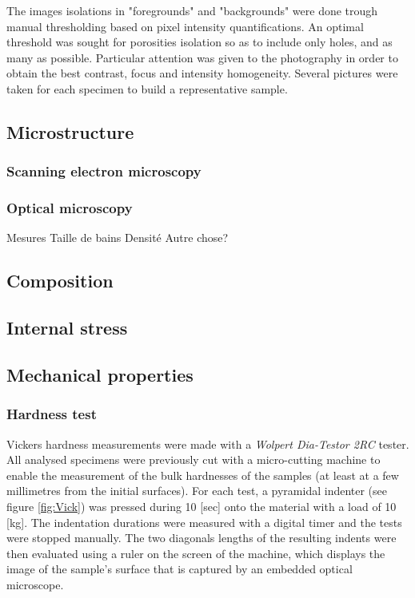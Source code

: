 The images isolations in "foregrounds" and "backgrounds" were done trough manual thresholding based on pixel intensity quantifications.  %
An optimal threshold was sought for porosities isolation so as to include only holes, and as many as possible. Particular attention was given to the photography in order to obtain the best contrast, focus and intensity homogeneity. Several pictures were taken for each specimen to build a representative sample.

\subsection{Microstructure}

\subsubsection{Scanning electron microscopy}

\subsubsection{Optical microscopy}
Mesures Taille de bains
Densité
Autre chose?
\subsection{Composition}

\subsection{Internal stress}

\subsection{Mechanical properties}

\subsubsection{Hardness test}

Vickers hardness measurements were made with a \textit{Wolpert Dia-Testor 2RC} tester. All analysed specimens were previously cut with a micro-cutting machine to enable the measurement of the bulk hardnesses of the samples (at least at a few millimetres from the initial surfaces). For each test, a pyramidal indenter (see figure \ref{fig:Vick}) was pressed during 10 [sec] onto the material  with a load of 10 [kg]. The indentation durations were measured with a digital timer and the tests were stopped manually. The two diagonals lengths of the resulting indents were then evaluated using a ruler on the screen of the machine, which displays the image of the sample's surface that is captured by an embedded optical microscope.\\

